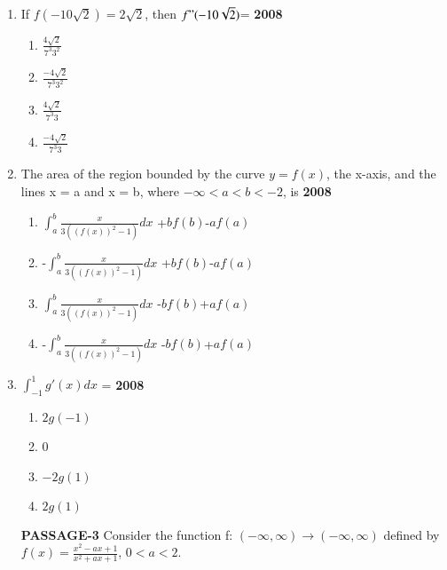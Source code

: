 \documentclass[journal,12pt,twocolumn]{IEEEtran}
\theoremstyle{remark}
\begin{document}
\begin{enumerate}
\item If $f(-10\sqrt{2})=2\sqrt{2}$, then $f"(-10\sqrt{2})$=
\hfill{\textbf{2008}}
\begin{enumerate}
    \item $\frac{4\sqrt{2}}{7^3 3^2}$
    \item $\frac{-4\sqrt{2}}{7^3 3^2}$ 
     \item $\frac{4\sqrt{2}}{7^3 3}$  
     \item $\frac{-4\sqrt{2}}{7^3 3}$ 
\end{enumerate}
\item The area of the region bounded by the curve $y=f(x)$, the x-axis, and the lines x = a and x = b, where $-\infty <a<b<-2$, is
\hfill{\textbf{2008}}
\begin{enumerate}
    \item $\int_a^b\frac{x}{3((f(x))^2-1)}dx$ +$bf(b)$-$af(a)$ 
    \item -$\int_a^b\frac{x}{3((f(x))^2-1)}dx$ +$bf(b)$-$af(a)$
    \item $\int_a^b\frac{x}{3((f(x))^2-1)}dx$ -$bf(b)$+$af(a)$ 
    \item -$\int_a^b\frac{x}{3((f(x))^2-1)}dx$ -$bf(b)$+$af(a)$ 
\end{enumerate}
\item $\int_ {-1}^{1} g'(x)dx$ =
\hfill{\textbf{2008}}
\begin{enumerate}
    \item $2g(-1)$
    \item 0
    \item $-2g(1)$
    \item $2g(1)$ 
\end{enumerate}
\textbf{PASSAGE-3}
Consider the function f: $(-\infty,\infty)\rightarrow(-\infty,\infty)$ defined by $f(x)=\frac{x^2 -ax+1}{x^2+ax+1}$, $ 0<a<2.$


\end{enumerate}
\end{document}
